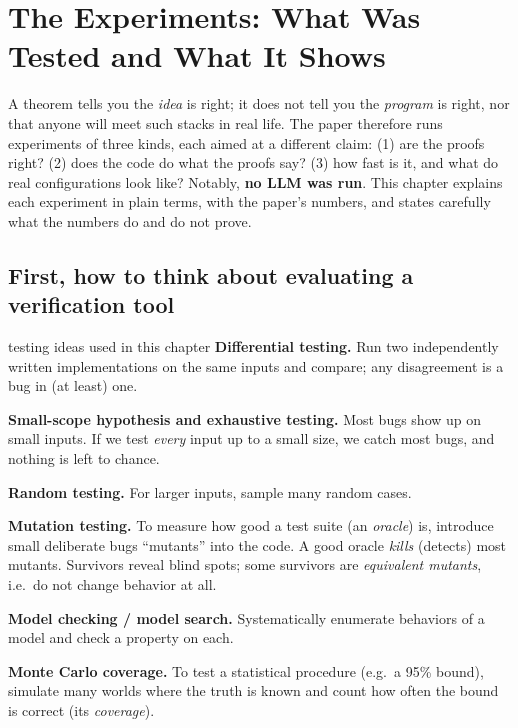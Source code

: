 \section{The Experiments: What Was Tested and What It Shows}
\label{ch:evaluation}

\begin{bigidea}
A theorem tells you the \emph{idea} is right; it does not tell you the \emph{program} is right, nor that anyone will meet such stacks in real life. The paper therefore runs experiments of three kinds, each aimed at a different claim: (1) are the proofs right? (2) does the code do what the proofs say? (3) how fast is it, and what do real configurations look like? Notably, \textbf{no LLM was run}. This chapter explains each experiment in plain terms, with the paper's numbers, and states carefully what the numbers do and do not prove.
\end{bigidea}

\subsection{First, how to think about evaluating a verification tool}

\begin{toolbox}{testing ideas used in this chapter}
\textbf{Differential testing.} Run two independently written implementations on the same inputs and compare; any disagreement is a bug in (at least) one.

\textbf{Small-scope hypothesis and exhaustive testing.} Most bugs show up on small inputs. If we test \emph{every} input up to a small size, we catch most bugs, and nothing is left to chance.

\textbf{Random testing.} For larger inputs, sample many random cases.

\textbf{Mutation testing.} To measure how good a test suite (an \emph{oracle}) is, introduce small deliberate bugs ``mutants'' into the code. A good oracle \emph{kills} (detects) most mutants. Survivors reveal blind spots; some survivors are \emph{equivalent mutants}, i.e.\ do not change behavior at all.

\textbf{Model checking / model search.} Systematically enumerate behaviors of a model and check a property on each.

\textbf{Monte Carlo coverage.} To test a statistical procedure (e.g.\ a 95\% bound), simulate many worlds where the truth is known and count how often the bound is correct (its \emph{coverage}).
\end{toolbox}

